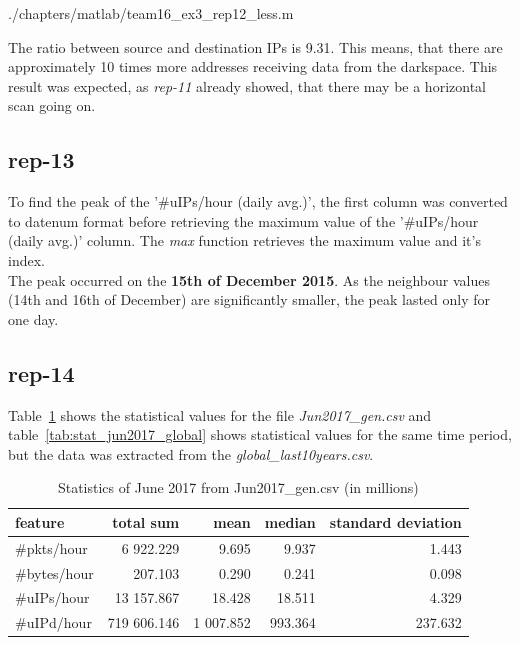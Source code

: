 
				{./chapters/matlab/team16_ex3_rep12_less.m}


The ratio between source and destination IPs is 9.31. This means, that there are approximately 10 times more addresses receiving data from the darkspace. This result was expected, as \textit{rep-11} already showed, that there may be a horizontal scan going on.

\subsection*{rep-13}
To find the peak of the '\#uIPs/hour (daily avg.)', the first column was converted to datenum format before retrieving the maximum value of the '\#uIPs/hour (daily avg.)' column. The \textit{max} function retrieves the maximum value and it's index. \\
The peak occurred on the \textbf{15th of December 2015}. As the neighbour values (14th and 16th of December) are significantly smaller, the peak lasted only for one day.

\subsection*{rep-14}
Table~\ref{tab:stat_jun2017_gen} shows the statistical values for the file \textit{Jun2017\_gen.csv} and table~\ref{tab:stat_jun2017_global} shows statistical values for the same time period, but the data was extracted from the \textit{global\_last10years.csv}. 

\begin{table}[H]
\center
\begin{tabular}{lrrrr}
\toprule
feature & total sum & mean & median & standard deviation \\
\midrule
\#pkts/hour & 6 922.229  &   9.695  &    9.937  &   1.443 \\
\#bytes/hour & 207.103  &   0.290   &   0.241  &   0.098 \\
\#uIPs/hour  & 13 157.867  &  18.428  &   18.511 &    4.329 \\
\#uIPd/hour  & 719 606.146 &  1 007.852 &   993.364 &  237.632 \\
\bottomrule
\end{tabular}
\caption{Statistics of June 2017 from Jun2017\_gen.csv (in millions)}
\label{tab:stat_jun2017_gen}
\end{table}

